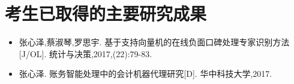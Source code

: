 \section{考生已取得的主要研究成果}\label{sec:1.2}
\begin{itemize}
    \item 张心泽,蔡淑琴,罗思宇. 基于支持向量机的在线负面口碑处理专家识别方法[J/OL]. 统计与决策,2017,(22):79-83.
    \item 张心泽. 账务智能处理中的会计机器代理研究[D]. 华中科技大学,2017.
\end{itemize}